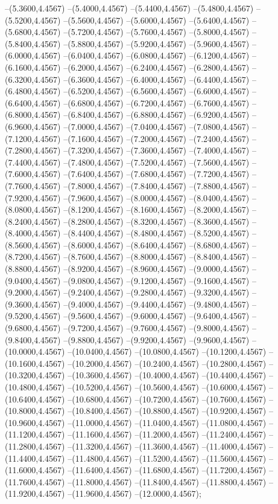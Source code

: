 {	--(5.3600,4.4567)
	--(5.4000,4.4567)
	--(5.4400,4.4567)
	--(5.4800,4.4567)
	--(5.5200,4.4567)
	--(5.5600,4.4567)
	--(5.6000,4.4567)
	--(5.6400,4.4567)
	--(5.6800,4.4567)
	--(5.7200,4.4567)
	--(5.7600,4.4567)
	--(5.8000,4.4567)
	--(5.8400,4.4567)
	--(5.8800,4.4567)
	--(5.9200,4.4567)
	--(5.9600,4.4567)
	--(6.0000,4.4567)
	--(6.0400,4.4567)
	--(6.0800,4.4567)
	--(6.1200,4.4567)
	--(6.1600,4.4567)
	--(6.2000,4.4567)
	--(6.2400,4.4567)
	--(6.2800,4.4567)
	--(6.3200,4.4567)
	--(6.3600,4.4567)
	--(6.4000,4.4567)
	--(6.4400,4.4567)
	--(6.4800,4.4567)
	--(6.5200,4.4567)
	--(6.5600,4.4567)
	--(6.6000,4.4567)
	--(6.6400,4.4567)
	--(6.6800,4.4567)
	--(6.7200,4.4567)
	--(6.7600,4.4567)
	--(6.8000,4.4567)
	--(6.8400,4.4567)
	--(6.8800,4.4567)
	--(6.9200,4.4567)
	--(6.9600,4.4567)
	--(7.0000,4.4567)
	--(7.0400,4.4567)
	--(7.0800,4.4567)
	--(7.1200,4.4567)
	--(7.1600,4.4567)
	--(7.2000,4.4567)
	--(7.2400,4.4567)
	--(7.2800,4.4567)
	--(7.3200,4.4567)
	--(7.3600,4.4567)
	--(7.4000,4.4567)
	--(7.4400,4.4567)
	--(7.4800,4.4567)
	--(7.5200,4.4567)
	--(7.5600,4.4567)
	--(7.6000,4.4567)
	--(7.6400,4.4567)
	--(7.6800,4.4567)
	--(7.7200,4.4567)
	--(7.7600,4.4567)
	--(7.8000,4.4567)
	--(7.8400,4.4567)
	--(7.8800,4.4567)
	--(7.9200,4.4567)
	--(7.9600,4.4567)
	--(8.0000,4.4567)
	--(8.0400,4.4567)
	--(8.0800,4.4567)
	--(8.1200,4.4567)
	--(8.1600,4.4567)
	--(8.2000,4.4567)
	--(8.2400,4.4567)
	--(8.2800,4.4567)
	--(8.3200,4.4567)
	--(8.3600,4.4567)
	--(8.4000,4.4567)
	--(8.4400,4.4567)
	--(8.4800,4.4567)
	--(8.5200,4.4567)
	--(8.5600,4.4567)
	--(8.6000,4.4567)
	--(8.6400,4.4567)
	--(8.6800,4.4567)
	--(8.7200,4.4567)
	--(8.7600,4.4567)
	--(8.8000,4.4567)
	--(8.8400,4.4567)
	--(8.8800,4.4567)
	--(8.9200,4.4567)
	--(8.9600,4.4567)
	--(9.0000,4.4567)
	--(9.0400,4.4567)
	--(9.0800,4.4567)
	--(9.1200,4.4567)
	--(9.1600,4.4567)
	--(9.2000,4.4567)
	--(9.2400,4.4567)
	--(9.2800,4.4567)
	--(9.3200,4.4567)
	--(9.3600,4.4567)
	--(9.4000,4.4567)
	--(9.4400,4.4567)
	--(9.4800,4.4567)
	--(9.5200,4.4567)
	--(9.5600,4.4567)
	--(9.6000,4.4567)
	--(9.6400,4.4567)
	--(9.6800,4.4567)
	--(9.7200,4.4567)
	--(9.7600,4.4567)
	--(9.8000,4.4567)
	--(9.8400,4.4567)
	--(9.8800,4.4567)
	--(9.9200,4.4567)
	--(9.9600,4.4567)
	--(10.0000,4.4567)
	--(10.0400,4.4567)
	--(10.0800,4.4567)
	--(10.1200,4.4567)
	--(10.1600,4.4567)
	--(10.2000,4.4567)
	--(10.2400,4.4567)
	--(10.2800,4.4567)
	--(10.3200,4.4567)
	--(10.3600,4.4567)
	--(10.4000,4.4567)
	--(10.4400,4.4567)
	--(10.4800,4.4567)
	--(10.5200,4.4567)
	--(10.5600,4.4567)
	--(10.6000,4.4567)
	--(10.6400,4.4567)
	--(10.6800,4.4567)
	--(10.7200,4.4567)
	--(10.7600,4.4567)
	--(10.8000,4.4567)
	--(10.8400,4.4567)
	--(10.8800,4.4567)
	--(10.9200,4.4567)
	--(10.9600,4.4567)
	--(11.0000,4.4567)
	--(11.0400,4.4567)
	--(11.0800,4.4567)
	--(11.1200,4.4567)
	--(11.1600,4.4567)
	--(11.2000,4.4567)
	--(11.2400,4.4567)
	--(11.2800,4.4567)
	--(11.3200,4.4567)
	--(11.3600,4.4567)
	--(11.4000,4.4567)
	--(11.4400,4.4567)
	--(11.4800,4.4567)
	--(11.5200,4.4567)
	--(11.5600,4.4567)
	--(11.6000,4.4567)
	--(11.6400,4.4567)
	--(11.6800,4.4567)
	--(11.7200,4.4567)
	--(11.7600,4.4567)
	--(11.8000,4.4567)
	--(11.8400,4.4567)
	--(11.8800,4.4567)
	--(11.9200,4.4567)
	--(11.9600,4.4567)
	--(12.0000,4.4567);
}
